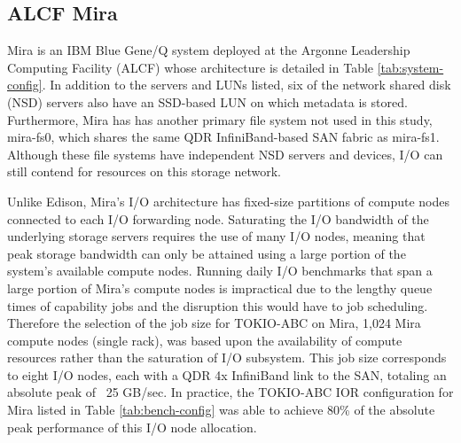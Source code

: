 \subsection{ALCF Mira} \label{sec:platforms/mira}

Mira is an IBM Blue Gene/Q system deployed at the Argonne Leadership Computing Facility (ALCF) whose architecture is detailed in Table \ref{tab:system-config}.  In addition to the servers and LUNs listed, six of the network shared disk (NSD) servers also have an SSD-based LUN on which metadata is stored.  Furthermore, 
Mira has has another primary file system not used in this study, mira-fs0, which shares the same QDR InfiniBand-based SAN fabric as mira-fs1.
Although these file systems have independent NSD servers and devices, I/O can still contend for resources on this storage network.


Unlike Edison, Mira's I/O architecture has fixed-size partitions of compute nodes connected to each I/O forwarding node.
Saturating the I/O bandwidth of the underlying storage servers requires the
use of many I/O nodes, meaning that peak storage bandwidth can only be
attained using a large portion of the system's available compute nodes.
Running daily I/O benchmarks that span a large portion of Mira's compute
nodes is impractical due to the lengthy queue times of capability jobs and
the disruption this would have to job scheduling. Therefore the selection of the job size for TOKIO-ABC on Mira, 1,024 Mira compute nodes (single
rack), was based upon the availability of compute resources rather than the saturation of
I/O subsystem.  This job size corresponds to eight I/O nodes, each with a QDR 4x InfiniBand link to the SAN, totaling an absolute peak of ~25 GB/sec.
In practice, the TOKIO-ABC IOR configuration for Mira listed in Table \ref{tab:bench-config} was able to achieve 80\% of the absolute peak performance of this I/O node allocation.
